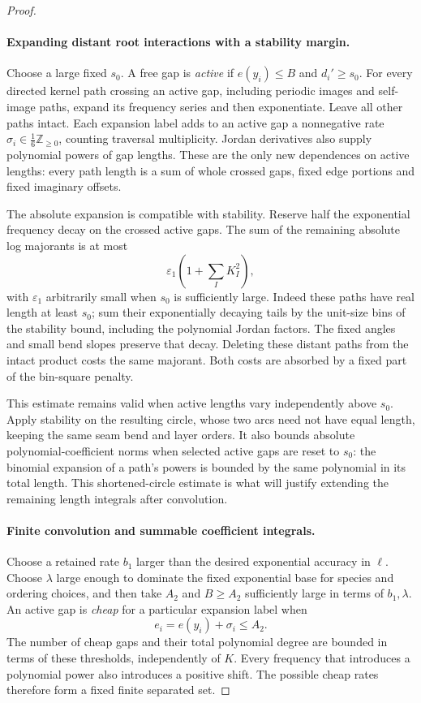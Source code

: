 \documentclass[11pt]{article}
\numberwithin{equation}{section}
\theoremstyle{definition}\newtheorem{definition}[theorem]{Definition}
\theoremstyle{remark}\newtheorem{remark}[theorem]{Remark}
\begin{document}
\begin{proof}
\paragraph{Expanding distant root interactions with a stability margin.}
Choose a large fixed \(s_0\). A free gap is \emph{active} if
\(e(y_i)\le B\) and \(d_i'\ge s_0\). For every directed kernel path
crossing an active gap, including periodic images and self-image paths,
expand its frequency series and then exponentiate. Leave all other
paths intact. Each expansion label adds to an active gap a nonnegative
rate \(\sigma_i\in\tfrac16\mathbb Z_{\ge0}\), counting traversal
multiplicity. Jordan derivatives also supply polynomial powers of gap
lengths. These are the only new dependences on active lengths: every
path length is a sum of whole crossed gaps, fixed edge portions and
fixed imaginary offsets.

The absolute expansion is compatible with stability. Reserve half the
exponential frequency decay on the crossed active gaps. The sum of the
remaining absolute log majorants is at most
\[
 \varepsilon_1\left(1+\sum_I K_I^2\right),
\]
with \(\varepsilon_1\) arbitrarily small when \(s_0\) is sufficiently
large. Indeed these paths have real length at least \(s_0\); sum their
exponentially decaying tails by the unit-size bins of the stability
bound, including the polynomial Jordan factors. The fixed angles and
small bend slopes preserve that decay. Deleting these distant paths
from the intact product costs the same majorant. Both costs are
absorbed by a fixed part of the bin-square penalty.

This estimate remains valid when active lengths vary independently
above \(s_0\). Apply stability on the resulting circle, whose two arcs
need not have equal length, keeping the same seam bend and layer
orders. It also bounds absolute polynomial-coefficient norms when
selected active gaps are reset to \(s_0\): the binomial expansion of a
path's powers is bounded by the same polynomial in its total length.
This shortened-circle estimate is what will justify extending the
remaining length integrals after convolution.

\paragraph{Finite convolution and summable coefficient integrals.}
Choose a retained rate \(b_1\) larger than the desired exponential
accuracy in \(\ell\). Choose \(\lambda\) large enough to dominate the
fixed exponential base for species and ordering choices, and then take
\(A_2\) and \(B\ge A_2\) sufficiently large in terms of \(b_1,\lambda\).
An active gap is \emph{cheap} for a particular expansion label when
\[
 e_i=e(y_i)+\sigma_i\le A_2.
\]
The number of cheap gaps and their total polynomial degree are bounded
in terms of these thresholds, independently of \(K\). Every frequency
that introduces a polynomial power also introduces a positive shift.
The possible cheap rates therefore form a fixed finite separated set.


\end{proof}
\end{document}

